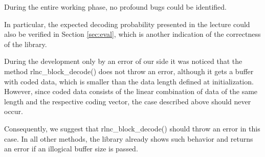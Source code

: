 \documentclass[a4paper,english,10pt]{tumarticle}
\begin{document}
During the entire working phase, no profound bugs could be identified.

In particular, the expected decoding probability presented in the lecture 
could also be verified in Section \ref{sec:eval}, which is another indication of the correctness of the library.

During the development only by an error of our side it was noticed that the method rlnc\_block\_decode() does not 
throw an error, although it gets a buffer with coded data, which is smaller than the data length defined 
at initialization. However, since coded data consists of the linear combination of data of the same length and 
the respective coding vector, the case described above should never occur.

Consequently, we suggest that rlnc\_block\_decode() should throw an error in this case. In all other methods, 
the library already shows such behavior and returns an error if an illogical buffer size is passed.
\end{document}
